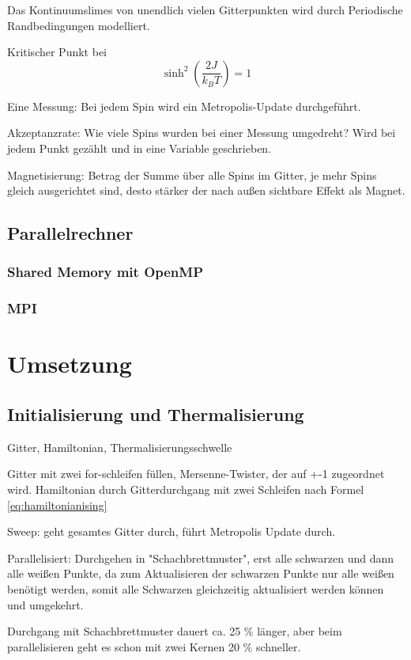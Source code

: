 \documentclass{scrreprt}
\begin{document}
	Das Kontinuumslimes von unendlich vielen Gitterpunkten wird durch Periodische Randbedingungen modelliert.
	
	Kritischer Punkt bei \[\sinh^2\left(\frac{2J}{k_BT}\right) =1\]
	\cite{OnsagerCrystal1}
	
	Eine Messung: Bei jedem Spin wird ein Metropolis-Update durchgeführt.
	
	Akzeptanzrate: Wie viele Spins wurden bei einer Messung umgedreht? Wird bei jedem Punkt gezählt und in eine Variable geschrieben.
	
	Magnetisierung: Betrag der Summe über alle Spins im Gitter, je mehr Spins gleich ausgerichtet sind, desto stärker der nach außen sichtbare Effekt als Magnet.
	
	
	\section{Parallelrechner}
	\subsection{Shared Memory mit OpenMP}
	\subsection{MPI}
	
	
	\chapter{Umsetzung}
	\section{Initialisierung und Thermalisierung}
	Gitter, Hamiltonian, Thermalisierungsschwelle
	
	Gitter mit zwei for-schleifen füllen, Mersenne-Twister, der auf +-1 zugeordnet wird.
	Hamiltonian durch Gitterdurchgang mit zwei Schleifen nach Formel \ref{eq:hamiltonianising}
	
	Sweep: geht gesamtes Gitter durch, führt Metropolis Update durch.
	
	Parallelisiert: Durchgehen in "Schachbrettmuster", erst alle schwarzen und dann alle weißen Punkte, da zum Aktualisieren der schwarzen Punkte nur alle weißen benötigt werden, somit alle Schwarzen gleichzeitig aktualisiert werden können und umgekehrt.
	
	Durchgang mit Schachbrettmuster dauert ca. 25 \% länger, aber beim parallelisieren geht es schon mit zwei Kernen 20 \% schneller. 
	
\end{document}

